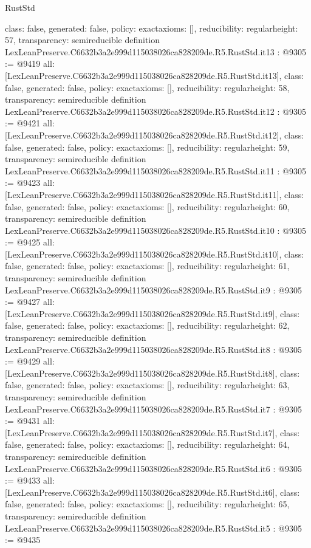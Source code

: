 \begin{lexlean}{RustStd}
\begin{coremodule}
{  class: false,
  generated: false,
  policy: exact{axioms: []},
  reducibility: regular{height: 57},
  transparency: semireducible
}
definition LexLeanPreserve.C6632b3a2e999d115038026ca828209de.R5.RustStd.it13 : @9305 := @9419 {
  all: [LexLeanPreserve.C6632b3a2e999d115038026ca828209de.R5.RustStd.it13],
  class: false,
  generated: false,
  policy: exact{axioms: []},
  reducibility: regular{height: 58},
  transparency: semireducible
}
definition LexLeanPreserve.C6632b3a2e999d115038026ca828209de.R5.RustStd.it12 : @9305 := @9421 {
  all: [LexLeanPreserve.C6632b3a2e999d115038026ca828209de.R5.RustStd.it12],
  class: false,
  generated: false,
  policy: exact{axioms: []},
  reducibility: regular{height: 59},
  transparency: semireducible
}
definition LexLeanPreserve.C6632b3a2e999d115038026ca828209de.R5.RustStd.it11 : @9305 := @9423 {
  all: [LexLeanPreserve.C6632b3a2e999d115038026ca828209de.R5.RustStd.it11],
  class: false,
  generated: false,
  policy: exact{axioms: []},
  reducibility: regular{height: 60},
  transparency: semireducible
}
definition LexLeanPreserve.C6632b3a2e999d115038026ca828209de.R5.RustStd.it10 : @9305 := @9425 {
  all: [LexLeanPreserve.C6632b3a2e999d115038026ca828209de.R5.RustStd.it10],
  class: false,
  generated: false,
  policy: exact{axioms: []},
  reducibility: regular{height: 61},
  transparency: semireducible
}
definition LexLeanPreserve.C6632b3a2e999d115038026ca828209de.R5.RustStd.it9 : @9305 := @9427 {
  all: [LexLeanPreserve.C6632b3a2e999d115038026ca828209de.R5.RustStd.it9],
  class: false,
  generated: false,
  policy: exact{axioms: []},
  reducibility: regular{height: 62},
  transparency: semireducible
}
definition LexLeanPreserve.C6632b3a2e999d115038026ca828209de.R5.RustStd.it8 : @9305 := @9429 {
  all: [LexLeanPreserve.C6632b3a2e999d115038026ca828209de.R5.RustStd.it8],
  class: false,
  generated: false,
  policy: exact{axioms: []},
  reducibility: regular{height: 63},
  transparency: semireducible
}
definition LexLeanPreserve.C6632b3a2e999d115038026ca828209de.R5.RustStd.it7 : @9305 := @9431 {
  all: [LexLeanPreserve.C6632b3a2e999d115038026ca828209de.R5.RustStd.it7],
  class: false,
  generated: false,
  policy: exact{axioms: []},
  reducibility: regular{height: 64},
  transparency: semireducible
}
definition LexLeanPreserve.C6632b3a2e999d115038026ca828209de.R5.RustStd.it6 : @9305 := @9433 {
  all: [LexLeanPreserve.C6632b3a2e999d115038026ca828209de.R5.RustStd.it6],
  class: false,
  generated: false,
  policy: exact{axioms: []},
  reducibility: regular{height: 65},
  transparency: semireducible
}
definition LexLeanPreserve.C6632b3a2e999d115038026ca828209de.R5.RustStd.it5 : @9305 := @9435 {
}
\end{coremodule}
\end{lexlean}
